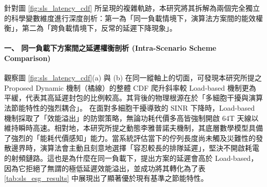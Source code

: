 針對圖 \ref{fig:sls_latency_cdf} 所呈現的複雜軌跡，本研究將其拆解為兩個完全獨立的科學變數維度進行深度剖析：第一為「同一負載情境下，演算法方案間的能效權衡」，第二為「跨負載情境下，反常的延遲下降現象」。

\paragraph{一、 同一負載下方案間之延遲權衡剖析 (Intra-Scenario Scheme Comparison)}
觀察圖 \ref{fig:sls_latency_cdf}(a) 與 (b) 在同一縱軸上的切面，可發現本研究所提之 Proposed Dynamic 機制（橘線）的整體 CDF 爬升斜率較 Load-based 機制更為平緩，代表其高延遲封包的比例較高。其背後的物理根源在於「多細胞干擾與演算法節能特性的強烈耦合」。
在面對多細胞干擾導致的 SINR 下降時，Load-based 機制採取了「效能溢出」的防禦策略，無論功耗代價多高皆強制開啟 64T 天線以維持瞬時高速。相對地，本研究所提之動態李雅普諾夫機制，其底層數學模型具備了強烈的「能耗代價感知」能力。當系統評估當下的佇列長度尚未觸及災難性的發散邊界時，演算法會主動且刻意地選擇「容忍較長的排隊延遲」，堅決不開啟耗電的射頻鏈路。這也是為什麼在同一負載下，提出方案的延遲會高於 Load-based，因為它拒絕了無謂的極低延遲效能溢出，並成功將其轉化為了表 \ref{tab:sls_esg_results} 中展現出了顯著優於現有基準之節能特性。

